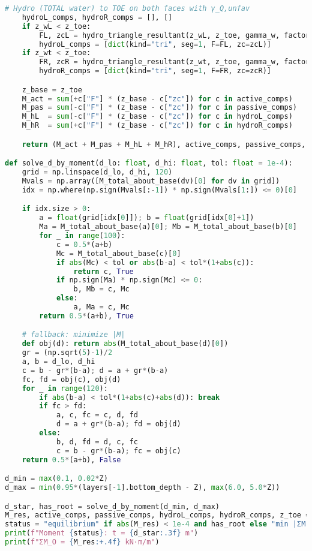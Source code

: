 \begin{lstlisting}[language=Python]
    # Hydro (TOTAL water) to TOE on both faces with γ_Q,unfav
    hydroL_comps, hydroR_comps = [], []
    if z_wL < z_toe:
        FL, zcL = hydro_triangle_resultant(z_wL, z_toe, gamma_w, factor=gamma_G_unfav)
        hydroL_comps = [dict(kind="tri", seg=1, F=FL, zc=zcL)]          # left → CW(-)
    if z_wt < z_toe:
        FR, zcR = hydro_triangle_resultant(z_wt, z_toe, gamma_w, factor=gamma_G_unfav)
        hydroR_comps = [dict(kind="tri", seg=1, F=FR, zc=zcR)]          # right → CCW(+)

    z_base = z_toe
    M_act = sum(+c["F"] * (z_base - c["zc"]) for c in active_comps)     # CCW(+)
    M_pas = sum(-c["F"] * (z_base - c["zc"]) for c in passive_comps)    # CW(-)
    M_hL  = sum(-c["F"] * (z_base - c["zc"]) for c in hydroL_comps)     # CW(-)
    M_hR  = sum(+c["F"] * (z_base - c["zc"]) for c in hydroR_comps)     # CCW(+)

    return (M_act + M_pas + M_hL + M_hR), active_comps, passive_comps, hydroL_comps, hydroR_comps, z_toe

def solve_d_by_moment(d_lo: float, d_hi: float, tol: float = 1e-4):
    grid = np.linspace(d_lo, d_hi, 120)
    Mvals = np.array([M_total_about_base(dv)[0] for dv in grid])
    idx = np.where(np.sign(Mvals[:-1]) * np.sign(Mvals[1:]) <= 0)[0]

    if idx.size > 0:
        a = float(grid[idx[0]]); b = float(grid[idx[0]+1])
        Ma = M_total_about_base(a)[0]; Mb = M_total_about_base(b)[0]
        for _ in range(100):
            c = 0.5*(a+b)
            Mc = M_total_about_base(c)[0]
            if abs(Mc) < tol or abs(b-a) < tol*(1+abs(c)):
                return c, True
            if np.sign(Ma) * np.sign(Mc) <= 0:
                b, Mb = c, Mc
            else:
                a, Ma = c, Mc
        return 0.5*(a+b), True

    # fallback: minimize |M|
    def obj(d): return abs(M_total_about_base(d)[0])
    gr = (np.sqrt(5)-1)/2
    a, b = d_lo, d_hi
    c = b - gr*(b-a); d = a + gr*(b-a)
    fc, fd = obj(c), obj(d)
    for _ in range(120):
        if abs(b-a) < tol*(1+abs(c)+abs(d)): break
        if fc > fd:
            a, c, fc = c, d, fd
            d = a + gr*(b-a); fd = obj(d)
        else:
            b, d, fd = d, c, fc
            c = b - gr*(b-a); fc = obj(c)
    return 0.5*(a+b), False

d_min = max(0.1, 0.02*Z)
d_max = min(0.95*(layers[-1].bottom_depth - Z), max(6.0, 5.0*Z))

d_star, has_root = solve_d_by_moment(d_min, d_max)
M_res, active_comps, passive_comps, hydroL_comps, hydroR_comps, z_toe = M_total_about_base(d_star)
status = "equilibrium" if abs(M_res) < 1e-4 and has_root else "min |ΣM|"
print(f"Moment {status}: t = {d_star:.3f} m")
print(f"ΣM_O = {M_res:+.4f} kN·m/m")


\end{lstlisting}
